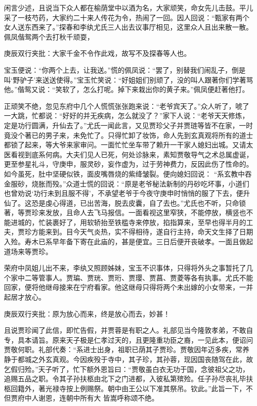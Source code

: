 \begin{parag}
    闲言少述，且说当下众人都在榆荫堂中以酒为名，大家顽笑，命女先儿击鼓。平儿采了一枝芍药，大家约二十来人传花为令，热闹了一回。因人回说：“甄家有两个女人送东西来了。”探春和李纨尤氏三人出去议事厅相见，这里众人且出来散一散。佩凤偕鸳两个去打秋千顽耍，\begin{note}庚辰双行夹批：大家千金不令作此戏，故写不及探春等人也。\end{note}宝玉便说：“你两个上去，让我送。”慌的佩凤说：“罢了，别替我们闹乱子，倒是叫‘野驴子’来送送使得。”宝玉忙笑说：“好姐姐们别顽了，没的叫人跟著你们学著骂他。”偕鸳又说：“笑软了，怎么打呢。掉下来栽出你的黄子来。”佩凤便赶著他打。
\end{parag}


\begin{parag}
    正顽笑不绝，忽见东府中几个人慌慌张张跑来说：“老爷宾天了。”众人听了，唬了一大跳，忙都说：“好好的并无疾病，怎么就没了？”家下人说：“老爷天天修炼，定是功行圆满，升仙去了。”尤氏一闻此言，又见贾珍父子并贾琏等皆不在家，一时竟没个著已的男子来，未免忙了。只得忙卸了妆饰，命人先到玄真观将所有的道士都锁了起来，等大爷来家审问。一面忙忙坐车带了赖升一干家人媳妇出城。又请太医看视到底系何病。大夫们见人已死，何处诊脉来，素知贾敬导气之术总属虚诞，更至参星礼斗，守庚申，服灵砂，妄作虚为，过于劳神费力，反因此伤了性命的。如今虽死，肚中坚硬似铁，面皮嘴唇烧的紫绛皱裂。便向媳妇回说： “系玄教中吞金服砂，烧胀而殁。”众道士慌的回说：“原是老爷秘法新制的丹砂吃坏事，小道们也曾劝说‘功行未到且服不得’，不承望老爷于今夜守庚申时悄悄的服了下去，便升仙了。这恐是虔心得道，已出苦海，脱去皮囊，自了去也。”尤氏也不听，只命锁著，等贾珍来发放，且命人去飞马报信。一面看视这里窄狭，不能停放，横竖也不能进城的，忙装裹好了，用软轿抬至铁槛寺来停放，掐指算来，至早也得半月的工夫，贾珍方能来到。目今天气炎热，实不得相待，遂自行主持，命天文生择了日期入殓。寿木已系早年备下寄在此庙的，甚是便宜。三日后便开丧破孝。一面且做起道场来等贾珍。
\end{parag}


\begin{parag}
    荣府中凤姐儿出不来，李纨又照顾姊妹，宝玉不识事体，只得将外头之事暂托了几个家中二等管事人。贾㻞、贾珖、贾珩、贾璎、贾菖、贾菱等各有执事。尤氏不能回家，便将他继母接来在宁府看家。他这继母只得将两个未出嫁的小女带来，一并起居才放心。\begin{note}庚辰双行夹批：原为放心而来，终是放心而去，妙甚！\end{note}
\end{parag}


\begin{parag}
    且说贾珍闻了此信，即忙告假，并贾蓉是有职之人。礼部见当今隆敦孝弟，不敢自专，具本请旨。原来天子极是仁孝过天的，且更隆重功臣之裔，一见此本，便诏问贾敬何职。礼部代奏：“系进士出身，祖职已荫其子贾珍。贾敬因年迈多疾，常养静于都城之外玄真观。今因疾殁于寺中，其子珍，其孙蓉，现因国丧随驾在此，故乞假归殓。”天子听了，忙下额外恩旨曰：“贾敬虽白衣无功于国，念彼祖父之功，追赐五品之职。令其子孙扶柩由北下之门进都，入彼私第殡殓。任子孙尽丧礼毕扶柩回籍外，著光禄寺按上例赐祭。朝中由王公以下准其祭吊。钦此。”此旨一下，不但贾府中人谢恩，连朝中所有大 皆嵩呼称颂不绝。
\end{parag}


